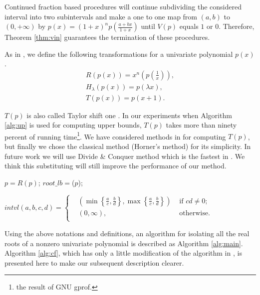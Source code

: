   Continued fraction based procedures will continue subdividing the considered interval into two subintervals and make a one to one map from $(a,b)$ to $(0,+\infty)$ by $  p(x) = (1+x)^{n}p(\frac{a+bx}{1+x})$ until $V(p)$ equals $1$ or $0$. Therefore, Theorem \ref{thm:vin} guarantees the termination of these  procedures.

\begin{definition} As in \cite{akr05}, we define the following transformations for a univariate polynomial $p(x)$.
  \begin{eqnarray*}
  R(p(x))=x^n(p(\frac{1}{x})),\\
  H_\lambda(p(x))=p(\lambda x),\\
  T(p(x))=p(x+1).
  \end{eqnarray*}
\end{definition}

$T(p)$  is also called	Taylor shift one \cite{ger04,joh05}. In our experiments when Algorithm \ref{alg:up} is used for computing upper bounds, $T(p)$  takes  more than
ninety percent of running time\footnote{the result of  GNU gprof.}.  We have considered methods in \cite{ger04} for computing $T(p)$, but   finally we chose the  classical
method (Horner's method) for its simplicity. In future work we will use Divide \& Conquer method which is the fastest in \cite{ger04}. We think this substituting
will still improve the performance of our method.

\begin{algorithm}
\caption{\dec}
\DontPrintSemicolon
{}
\end{algorithm}

\begin{algorithm}\label{alg:lb}
\caption{\lb}
\DontPrintSemicolon
{}
$p=R(p)$;\;
$root\_lb=$\up($p$); 
\label{alg:dec}
\end{algorithm}


\begin{definition}
$  intvl(a,b,c,d)=  \left\{\begin{aligned}
&  (\min\left\{ \frac{a}{c},\frac{b}{d} \right\},\max\left\{ \frac{a}{c},\frac{b}{d} \right\} ) &\text{ if } cd\neq0;\\
& (0,\infty), &\text{ otherwise}.\\
	\end{aligned}
	\right.
$
\end{definition}


Using the above notations and definitions, an algorithm for isolating all the real roots of a nonzero univariate polynomial is described as Algorithm \ref{alg:main}.
Algorithm \ref{alg:cf}, which has only a little modification of the algorithm in \cite{akr80,akr08}, is presented here to make our subsequent description clearer.

